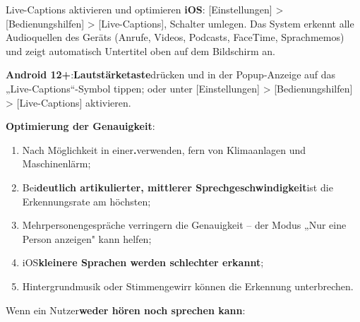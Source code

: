 \begin{tcbinfo}{Live-Captions aktivieren und optimieren}
\textbf{iOS}: [Einstellungen] > [Bedienungshilfen] > [Live-Captions], Schalter umlegen. Das System erkennt alle Audioquellen des Geräts (Anrufe, Videos, Podcasts, FaceTime, Sprachmemos) und zeigt automatisch Untertitel oben auf dem Bildschirm an.

\textbf{Android 12+}:\textbf{Lautstärketaste}drücken und in der Popup-Anzeige auf das „Live-Captions“-Symbol tippen; oder unter [Einstellungen] > [Bedienungshilfen] > [Live-Captions] aktivieren.

\textbf{Optimierung der Genauigkeit}:

\begin{enumerate}
  \item Nach Möglichkeit in einer\textbf{.}verwenden, fern von Klimaanlagen und Maschinenlärm;
  \item Bei\textbf{deutlich artikulierter, mittlerer Sprechgeschwindigkeit}ist die Erkennungsrate am höchsten;
  \item Mehrpersonengespräche verringern die Genauigkeit – der Modus „Nur eine Person anzeigen" kann helfen;
  \item iOS\textbf{kleinere Sprachen werden schlechter erkannt};
  \item Hintergrundmusik oder Stimmengewirr können die Erkennung unterbrechen.
\end{enumerate}

\end{tcbinfo}


Wenn ein Nutzer\textbf{weder hören noch sprechen kann}:

